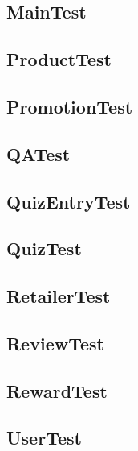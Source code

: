\documentclass{article}
\begin{document}
\subsection{MainTest}

\subsection{ProductTest}

\subsection{PromotionTest}

\subsection{QATest}

\subsection{QuizEntryTest}

\subsection{QuizTest}

\subsection{RetailerTest}

\subsection{ReviewTest}

\subsection{RewardTest}

\subsection{UserTest}

\end{document}
